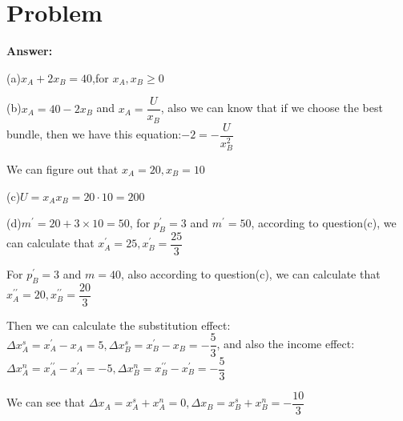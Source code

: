 \documentclass[a4 paper,12pt]{article}
\begin{document}
\section{Problem}
\noindent
\textbf{Answer:}
\par (a)$x_{A}+2x_{B}= 40$,\quad for $x_{A},x_{B}\geq 0$
\par (b)$x_{A}=40-2x_{B}$ and $x_{A}=\dfrac{U}{x_{B}}$, also we can know that if we choose the best bundle, then we have this equation:$-2=-\dfrac{U}{x_{B}^{2}}$
\par We can figure out that $x_{A}=20,x_{B}=10$
\par (c)$U=x_{A}x_{B}=20\cdot 10=200$
\par (d)$m^{\prime}=20+3\times 10=50$, for $p_{B}^{\prime}=3$ and $m^{\prime}=50$, according to question(c), we can calculate that $x_{A}^{\prime}=25,x_{B}^{\prime}=\dfrac{25}{3}$
\par For $p_{B}^{\prime}=3$ and $m=40$, also according to question(c), we can calculate that $x_{A}^{\prime\prime}=20,x_{B}^{\prime\prime}=\dfrac{20}{3}$
\par Then we can calculate the substitution effect:$\Delta x_{A}^{s}=x_{A}^{\prime}-x_{A}=5,\Delta x_{B}^{s}=x_{B}^{\prime}-x_{B}=-\dfrac{5}{3}$, and also the income effect:$\Delta x_{A}^{n}=x_{A}^{\prime\prime}-x_{A}^{\prime}=-5,\Delta x_{B}^{n}=x_{B}^{\prime\prime}-x_{B}^{\prime}=-\dfrac{5}{3}$
\par We can see that $\Delta x_{A}=x_{A}^{s}+x_{A}^{n}=0,\Delta x_{B}=x_{B}^{s}+x_{B}^{n}=-\dfrac{10}{3}$
\end{document}
